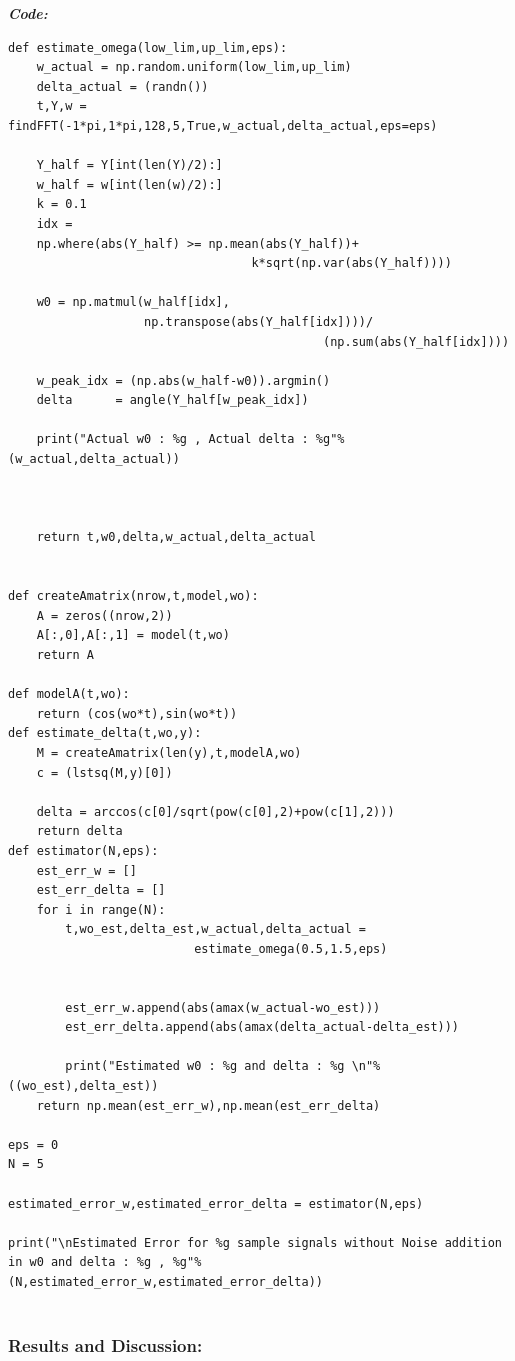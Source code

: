 \documentclass[11pt, a4paper]{article}
\begin{document}
\textit{\textbf{Code:}}
  \begin{lstlisting}
def estimate_omega(low_lim,up_lim,eps):
    w_actual = np.random.uniform(low_lim,up_lim)
    delta_actual = (randn())
    t,Y,w = findFFT(-1*pi,1*pi,128,5,True,w_actual,delta_actual,eps=eps)
    
    Y_half = Y[int(len(Y)/2):]
    w_half = w[int(len(w)/2):]
    k = 0.1
    idx = 
    np.where(abs(Y_half) >= np.mean(abs(Y_half))+
                                  k*sqrt(np.var(abs(Y_half))))
    
    w0 = np.matmul(w_half[idx],
                   np.transpose(abs(Y_half[idx])))/
                                            (np.sum(abs(Y_half[idx])))
    
    w_peak_idx = (np.abs(w_half-w0)).argmin()
    delta      = angle(Y_half[w_peak_idx])
    
    print("Actual w0 : %g , Actual delta : %g"%(w_actual,delta_actual))



    return t,w0,delta,w_actual,delta_actual


def createAmatrix(nrow,t,model,wo):
    A = zeros((nrow,2)) 
    A[:,0],A[:,1] = model(t,wo)
    return A

def modelA(t,wo):
    return (cos(wo*t),sin(wo*t))
def estimate_delta(t,wo,y):
    M = createAmatrix(len(y),t,modelA,wo)
    c = (lstsq(M,y)[0])
    
    delta = arccos(c[0]/sqrt(pow(c[0],2)+pow(c[1],2)))
    return delta
def estimator(N,eps):
    est_err_w = []
    est_err_delta = []
    for i in range(N):
        t,wo_est,delta_est,w_actual,delta_actual = 
                          estimate_omega(0.5,1.5,eps)


        est_err_w.append(abs(amax(w_actual-wo_est)))
        est_err_delta.append(abs(amax(delta_actual-delta_est)))
        
        print("Estimated w0 : %g and delta : %g \n"%((wo_est),delta_est))
    return np.mean(est_err_w),np.mean(est_err_delta)

eps = 0
N = 5

estimated_error_w,estimated_error_delta = estimator(N,eps)

print("\nEstimated Error for %g sample signals without Noise addition 
in w0 and delta : %g , %g"%(N,estimated_error_w,estimated_error_delta))


  \end{lstlisting}
  \subsubsection{Results and Discussion:}\label{results-and-discussion}
\end{document}
